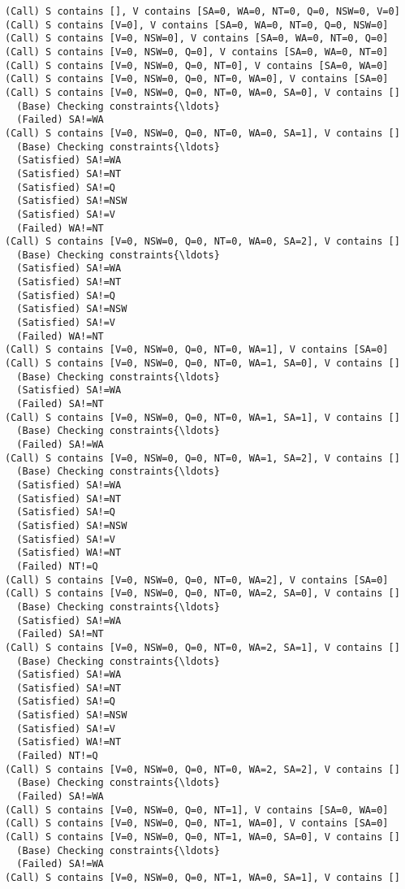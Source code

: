 \documentclass[11pt]{article}
\begin{document}
    \begin{Verbatim}[commandchars=\\\{\}]
(Call) S contains [], V contains [SA=0, WA=0, NT=0, Q=0, NSW=0, V=0]
(Call) S contains [V=0], V contains [SA=0, WA=0, NT=0, Q=0, NSW=0]
(Call) S contains [V=0, NSW=0], V contains [SA=0, WA=0, NT=0, Q=0]
(Call) S contains [V=0, NSW=0, Q=0], V contains [SA=0, WA=0, NT=0]
(Call) S contains [V=0, NSW=0, Q=0, NT=0], V contains [SA=0, WA=0]
(Call) S contains [V=0, NSW=0, Q=0, NT=0, WA=0], V contains [SA=0]
(Call) S contains [V=0, NSW=0, Q=0, NT=0, WA=0, SA=0], V contains []
  (Base) Checking constraints{\ldots}
  (Failed) SA!=WA
(Call) S contains [V=0, NSW=0, Q=0, NT=0, WA=0, SA=1], V contains []
  (Base) Checking constraints{\ldots}
  (Satisfied) SA!=WA
  (Satisfied) SA!=NT
  (Satisfied) SA!=Q
  (Satisfied) SA!=NSW
  (Satisfied) SA!=V
  (Failed) WA!=NT
(Call) S contains [V=0, NSW=0, Q=0, NT=0, WA=0, SA=2], V contains []
  (Base) Checking constraints{\ldots}
  (Satisfied) SA!=WA
  (Satisfied) SA!=NT
  (Satisfied) SA!=Q
  (Satisfied) SA!=NSW
  (Satisfied) SA!=V
  (Failed) WA!=NT
(Call) S contains [V=0, NSW=0, Q=0, NT=0, WA=1], V contains [SA=0]
(Call) S contains [V=0, NSW=0, Q=0, NT=0, WA=1, SA=0], V contains []
  (Base) Checking constraints{\ldots}
  (Satisfied) SA!=WA
  (Failed) SA!=NT
(Call) S contains [V=0, NSW=0, Q=0, NT=0, WA=1, SA=1], V contains []
  (Base) Checking constraints{\ldots}
  (Failed) SA!=WA
(Call) S contains [V=0, NSW=0, Q=0, NT=0, WA=1, SA=2], V contains []
  (Base) Checking constraints{\ldots}
  (Satisfied) SA!=WA
  (Satisfied) SA!=NT
  (Satisfied) SA!=Q
  (Satisfied) SA!=NSW
  (Satisfied) SA!=V
  (Satisfied) WA!=NT
  (Failed) NT!=Q
(Call) S contains [V=0, NSW=0, Q=0, NT=0, WA=2], V contains [SA=0]
(Call) S contains [V=0, NSW=0, Q=0, NT=0, WA=2, SA=0], V contains []
  (Base) Checking constraints{\ldots}
  (Satisfied) SA!=WA
  (Failed) SA!=NT
(Call) S contains [V=0, NSW=0, Q=0, NT=0, WA=2, SA=1], V contains []
  (Base) Checking constraints{\ldots}
  (Satisfied) SA!=WA
  (Satisfied) SA!=NT
  (Satisfied) SA!=Q
  (Satisfied) SA!=NSW
  (Satisfied) SA!=V
  (Satisfied) WA!=NT
  (Failed) NT!=Q
(Call) S contains [V=0, NSW=0, Q=0, NT=0, WA=2, SA=2], V contains []
  (Base) Checking constraints{\ldots}
  (Failed) SA!=WA
(Call) S contains [V=0, NSW=0, Q=0, NT=1], V contains [SA=0, WA=0]
(Call) S contains [V=0, NSW=0, Q=0, NT=1, WA=0], V contains [SA=0]
(Call) S contains [V=0, NSW=0, Q=0, NT=1, WA=0, SA=0], V contains []
  (Base) Checking constraints{\ldots}
  (Failed) SA!=WA
(Call) S contains [V=0, NSW=0, Q=0, NT=1, WA=0, SA=1], V contains []

\end{Verbatim}
\end{document}
